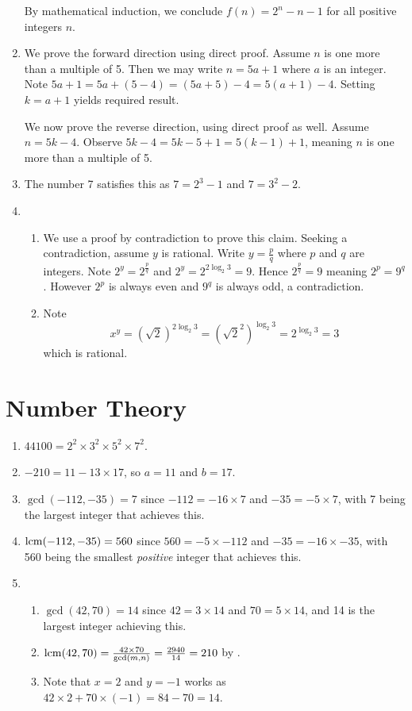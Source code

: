 \begin{enumerate}
    By mathematical induction, we conclude $f(n) = 2^n - n - 1$ for all positive integers $n$.
    
    \item We prove the forward direction using direct proof. Assume $n$ is one more than a multiple of 5. Then we may write $n = 5a + 1$ where $a$ is an integer. Note $5a + 1 = 5a + (5 - 4) = (5a + 5) - 4 = 5(a+1) - 4$. Setting $k = a+1$ yields required result.
    
    We now prove the reverse direction, using direct proof as well. Assume $n = 5k - 4$. Observe $5k - 4 = 5k - 5 + 1 = 5(k-1) + 1$, meaning $n$ is one more than a multiple of 5.
    
    \item The number 7 satisfies this as $7 = 2^3 - 1$ and $7 = 3^2 - 2$.
    
    \item \begin{enumerate}[label=(\roman*)]
        \item We use a proof by contradiction to prove this claim. Seeking a contradiction, assume $y$ is rational. Write $y = \frac pq$ where $p$ and $q$ are integers. Note $2^y = 2^{\frac pq}$ and $2^y = 2^{2\log_2{3}} = 9$. Hence $2^{\frac pq} = 9$ meaning $2^p = 9^q$. However $2^p$ is always even and $9^q$ is always odd, a contradiction.
        \item Note
        \[
            x^y = (\sqrt2)^{2\log_2{3}} = \left(\sqrt{2}^2\right)^{\log_2{3}} = 2^{\log_2{3}} = 3        
        \]
        which is rational.
    \end{enumerate}
\end{enumerate}

\section{Number Theory}
\begin{enumerate}
    \item $44100 = 2^2 \times 3^2 \times 5^2 \times 7^2$.
    \item $-210 = 11 - 13 \times 17$, so $a = 11$ and $b = 17$.
    \item $\gcd(-112, -35) = 7$ since $-112 = -16 \times 7$ and $-35 = -5 \times 7$, with 7 being the largest integer that achieves this.
    \item $\mathrm{lcm}(-112, -35) = 560$ since $560 = -5 \times -112$ and $-35 = -16 \times -35$, with 560 being the smallest \textit{positive} integer that achieves this.
    \item \begin{enumerate}[label=(\roman*)]
        \item $\gcd(42, 70) = 14$ since $42 = 3 \times 14$ and $70 = 5 \times 14$, and 14 is the largest integer achieving this.
        \item $\mathrm{lcm}(42, 70) = \frac{42 \times 70}{\gcd(m, n)} = \frac{2940}{14} = 210$ by .
        \item Note that $x = 2$ and $y = -1$ works as $42 \times 2 + 70 \times (-1) = 84 - 70 = 14$.
    \end{enumerate}
\end{enumerate}

